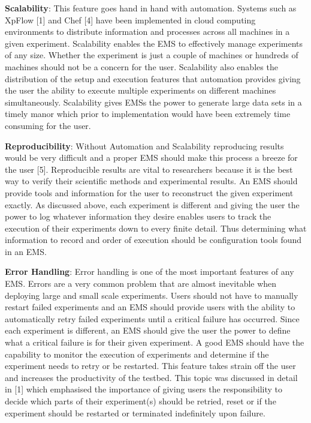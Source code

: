 \documentclass[11pt,twocolumn,letterpaper]{article}
\begin{document}
\textbf{Scalability}:  This feature goes hand in hand with automation.  Systems such as XpFlow [1] and Chef [4] have been implemented in cloud computing environments to distribute information and processes across all machines in a given experiment.  Scalability enables the EMS to effectively manage experiments of any size.  Whether the experiment is just a couple of machines or hundreds of machines should not be a concern for the user.  Scalability also enables the distribution of the setup and execution features that automation provides giving the user the ability to execute multiple experiments on different machines simultaneously.  Scalability gives EMSs the power to generate large data sets in a timely manor which prior to implementation would have been extremely time consuming for the user.

\textbf{Reproducibility}: Without Automation and Scalability reproducing results would be very difficult and a proper EMS should make this process a breeze for the user [5].  Reproducible results are vital to researchers because it is the best way to verify their scientific methods and experimental results.  An EMS should provide tools and information for the user to reconstruct the given experiment exactly. As discussed above, each experiment is different and giving the user the power to log whatever information they desire enables users to track the execution of their experiments down to every finite detail. Thus determining what information to record and order of execution should be configuration tools found in an EMS.

\textbf{Error Handling}:
Error handling is one of the most important features of any EMS.  Errors are a very common problem that are almost inevitable when deploying large and small scale experiments.  Users should not have to manually restart failed experiments and an EMS should provide users with the ability to automatically retry failed experiments until a critical failure has occurred.  Since each experiment is different, an EMS should give the user the power to define what a critical failure is for their given experiment. A good EMS should have the capability to monitor the execution of experiments and determine if the experiment needs to retry or be restarted.  This feature takes strain off the user and increases the productivity of the testbed. This topic was discussed in detail in [1] which emphasised the importance of giving users the responsibility to decide which parts of their experiment(s) should be retried, reset or if the experiment should be restarted or terminated indefinitely upon failure.
\end{document}
